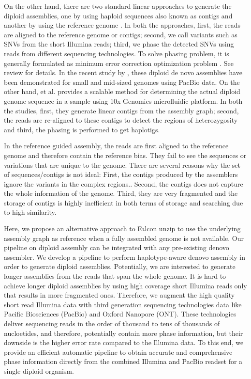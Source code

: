 On the other hand, there are two standard linear approaches to generate the diploid assemblies, one by using haploid sequences also known as contigs \cite{chin2016phased, pendleton2015assembly, seo2016novo, mostovoy2016hybrid} and another by using the reference genome \cite{glusman2014whole}.
In both the approaches, first, the reads are aligned to the reference genome or contigs; second, we call variants such as SNVs from the short Illumina reads; 
third, we phase the detected SNVs using reads from different sequencing technologies. To solve phasing problem, it is generally formulated as minimum error correction optimization problem \citep{cilibrasi2007complexity}. See review \citep{rhee2016survey} for details. 
In the recent study by \citep{chin2016phased}, these diploid de novo assemblies have been demonstrated for small and
mid-sized genomes using PacBio data. On the other hand, \citep{weisenfeld2017direct} et al. provides a scalable method for determining the actual diploid
genome sequence in a sample using 10x Genomics microfluidic platform. 
In both the studies, first, they generate linear contigs from the assembly graph; second, the reads are re-aligned to these contigs to detect the regions of heterozygosity and third, the phasing is performed to get haplotigs.

In the reference guided assembly, the reads are first aligned to the reference genome and therefore contain the reference bias. They fail to see the sequences or variations that are unique to the genome.
There are several reasons why the set of sequences/contigs is not ideal:
First, the contigs produced by the assemblers ignore the variants in the complex regions.. Second, the contigs does not capture the whole information of the genome.
Third, they are very fragmented and the storage of contigs is highly inefficient in both terms of storage and searching due to high similarity.

Here, we propose an alternative approach to Falcon unzip to use the underlying assembly graph as reference when a fully assembled genome is not available.
Our pipeline on diploid assembly can be integrated with any pre-existing denovo assembler.
We develop a pipeline to perform haplotype-aware denovo assembly in order to generate diploid assemblies.
Potentially, we are interested to generate longer assemblies from the reads that span the whole genome. It is hard to achieve longer diploid assemblies by using high coverage short Illumina reads only that results in more fragmented ones.
Therefore, we augment the high quality short read Illumina data with third generation sequencing technologies data like Pacific Biosciences (PacBio) and Oxford Nanopore (ONT).
These technologies deliver sequencing reads in the order of thousand to tens of thousands of nucloetides, and therefore, potentially contain more phase information, but their downside is the higher error rate compared to the Illumina data. 
To this end, we provide an efficient automatic pipeline to obtain accurate and comprehensive phase information directly from the combined Illumina and PacBio readset for a single diploid organism.

